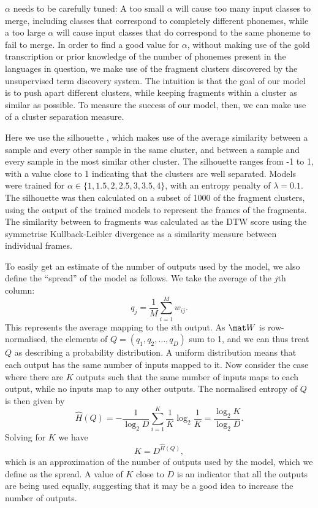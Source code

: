 $\alpha$ needs to be carefully tuned: A too small $\alpha$ will cause too many input classes to merge, including classes that correspond to completely different phonemes, while a too large $\alpha$ will cause input classes that do correspond to the same phoneme to fail to merge.
In order to find a good value for $\alpha$, without making use of the gold transcription or prior knowledge of the number of phonemes present in the languages in question, we make use of the fragment clusters discovered by the unsupervised term discovery system.
The intuition is that the goal of our model is to push apart different clusters, while keeping fragments within a cluster as similar as possible.
To measure the success of our model, then, we can make use of a cluster separation measure.

Here we use the silhouette \parencite{rousseeuw1987silhouettes}, which makes use of the average similarity between a sample and every other sample in the same cluster, and between a sample and every sample in the most similar other cluster.
The silhouette ranges from -1 to 1, with a value close to 1 indicating that the clusters are well separated.
Models were trained for $\alpha \in \{1, 1.5, 2, 2.5, 3, 3.5, 4\}$, with an entropy penalty of $\lambda = 0.1$.
The silhouette was then calculated on a subset of 1000 of the fragment clusters, using the output of the trained models to represent the frames of the fragments.
The similarity between to fragments was calculated as the DTW score using the symmetrise Kullback-Leibler divergence as a similarity measure between individual frames.

To easily get an estimate of the number of outputs used by the model, we also define the ``spread'' of the model as follows.
We take the average of the $j$th column:
\begin{equation}
  q_j = \frac{1}{M} \sum_{i=1}^M w_{ij}.
\end{equation}
This represents the average mapping to the $i$th output.
As $\mat W$ is row-normalised, the elements of $Q = (q_1, q_2, \dots, q_D)$ sum to 1, and we can thus treat $Q$ as describing a probability distribution.
A uniform distribution means that each output has the same number of inputs mapped to it.
Now consider the case where there are $K$ outputs such that the same number of inputs maps to each output, while no inputs map to any other outputs.
The normalised entropy of $Q$ is then given by
\begin{equation}
  \hat H(Q) = - \frac{1}{\log_2 D} \sum_{i=1}^K \frac{1}{K} \log_2 \frac{1}{K} = \frac{\log_2 K}{\log_2 D}.
\end{equation}
Solving for $K$ we have
\begin{equation}
  K = D^{\hat H(Q)},
\end{equation}
which is an approximation of the number of outputs used by the model, which we define as the spread.
A value of $K$ close to $D$ is an indicator that all the outputs are being used equally, suggesting that it may be a good idea to increase the number of outputs.

